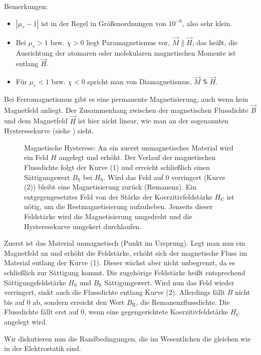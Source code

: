 Bemerkungen:
\begin{itemize}
	\item $\left| \mu _{r}-1\right| $ ist in der Regel in Größenordnungen von $10^{-6}$, also sehr klein.

	\item Bei $\mu _{r}>1$ bzw. $\chi >0$ liegt Paramagnetismus vor, $\vec {M}\parallel \vec {H}$, das heißt, die Ausrichtung der atomaren oder molekularen magnetischen Momente ist entlang $\vec {H}$.

	\item Für $\mu _{r}<1$ bzw. $\chi <0$ spricht man von Diamagnetismus, $\vec {M}\updownharpoons \vec {H}$.
\end{itemize}


Bei Ferromagnetismus gibt es eine permanente Magnetisierung, auch wenn kein Magnetfeld anliegt. Der Zusammenhang zwischen der magnetischen Flussdichte $\vec {B}$ und dem Magnetfeld $\vec {H}$ ist hier nicht linear, wie man an der sogenannten Hysteresekurve (siehe ) sieht.

\begin{figure}[ht]
	\centering
	\tfighysterese
	\caption{Magnetische Hysterese: An ein zuerst unmagnetisches Material wird ein Feld $H$ angelegt und erhöht. Der Verlauf der magnetischen Flussdichte folgt der Kurve (1) und erreicht schließlich einen Sättigungswert $B_\mathrm{S}$ bei $H_\mathrm{S}$. Wird das Feld auf 0 verringert (Kurve (2)) bleibt eine Magnetisierung zurück (Remanenz). Ein entgegengesetztes Feld von der Stärke der Koerzitivfeldstärke $H_\mathrm{C}$ ist nötig, um die Restmagnetisierung aufzuheben. Jenseits dieser Feldstärke wird die Magnetisierung umgedreht und die Hysteresekurve umgekert durchlaufen. }
	\label{fig:hysterese}
\end{figure}
Zuerst ist das Material unmagnetisch (Punkt im Ursprung). Legt man nun ein Magnetfeld an und erhöht die Feldstärke, erhöht sich der magnetische Fluss im Material entlang der Kurve (1). Dieser wächst aber nicht unbegrenzt, da es schließlich zur Sättigung kommt. Die zugehörige Feldstärke heißt entsprechend Sättigungsfeldstärke $H_{\mathrm{S}}$ und $B_{\mathrm{S}}$ Sättigungswert. Wird nun das Feld wieder verringert, sinkt auch die Flussdichte entlang Kurve (2). Allerdings fällt $B$ nicht bis auf $0$ ab, sondern erreicht den Wert $B_{\mathrm{R}}$, die Remanenzflussdichte. Die Flussdichte fällt erst auf $0$, wenn eine gegengerichtete Koerzitivfeldstärke $H_{\mathrm{C}}$ angelegt wird.

Wir diskutieren nun die Randbedingungen, die im Wesentlichen die gleichen wie in der Elektrostatik sind.


